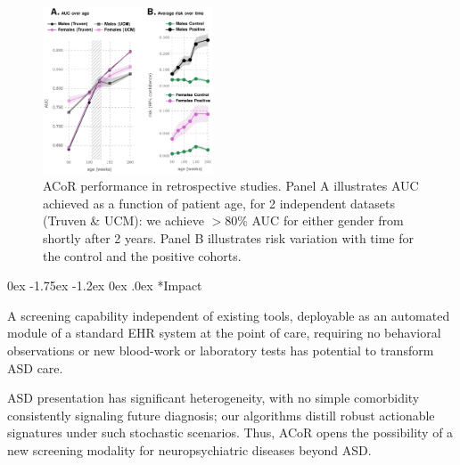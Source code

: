 \documentclass[onecolumn, compsoc,11pt]{IEEEtran}
\makeatletter
\renewcommand\subsection{\@startsection {subsection}{2}{\z@}%
                                   {0ex \@plus -1.75ex \@minus -1.2ex}%
                                   {0ex \@plus.0ex}%
                                   {\fontsize{11}{11}\selectfont\bfseries\sffamily\color{black}}}
\renewcommand{\captionN}[1]{\caption{\color{CadetBlue4!80!black} \sffamily \fontsize{9}{10}\selectfont #1  }}
\def\acor{ACoR\xspace}
\makeatother
\begin{document}
\begin{figure}
  \vspace{-12pt}
  
  \centering 
   \includegraphics[width=0.45\textwidth]{Figures/perf1}
   \vspace{-16pt}

    \captionN{\acor performance in retrospective studies. Panel A illustrates AUC achieved as a function of
      patient age, for 2 independent  datasets (Truven \& UCM): we achieve $>80\%$ AUC for either gender from shortly after 2 years.   Panel B illustrates  risk variation with time for the control and the positive cohorts. %
    }\label{fig2}
       \vspace{-15pt}

\end{figure}
\subsection*{Impact}

A  screening capability  independent of existing tools, deployable as an automated module  of a standard EHR system at the point of care, requiring no behavioral observations or  new blood-work or laboratory tests has potential to transform ASD care. 

ASD presentation has significant heterogeneity, with no simple comorbidity  consistently signaling future  diagnosis; our algorithms distill robust actionable signatures under such stochastic scenarios. Thus,  \acor opens the possibility of a new screening modality for  neuropsychiatric diseases beyond ASD.
\end{document}
